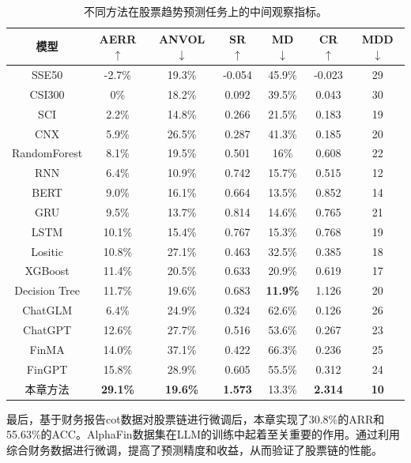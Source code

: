 \begin{table}
	\caption{\label{obv_indice_table}不同方法在股票趋势预测任务上的中间观察指标。}
	\centering{}%
	\small 
	\begin{tabular}{ccccccc}
		\toprule[2pt]
		模型 & AERR $\uparrow$ & ANVOL $\downarrow$ & SR $\uparrow$ & MD $\downarrow$ & CR $\uparrow$ & MDD $\downarrow$ \\
		\hline
		SSE50 & -2.7\% & 19.3\% & -0.054 & 45.9\% & -0.023 & 29 \\
		CSI300 & 0\% & 18.2\% & 0.092 & 39.5\% & 0.043 & 30 \\
		SCI & 2.2\% & 14.8\% & 0.266 & 21.5\% & 0.183 & 19 \\
		CNX & 5.9\% & 26.5\% & 0.287 & 41.3\% & 0.185 & 20 \\
		\hline
		RandomForest & 8.1\% & 19.5\% & 0.501 & 16\% & 0.608 & 22 \\
		RNN & 6.4\% & 10.9\% & 0.742 & 15.7\% & 0.515 & 12 \\
		BERT & 9.0\% & 16.1\% & 0.664 & 13.5\% & 0.852 & 14 \\
		GRU & 9.5\% & 13.7\% & 0.814 & 14.6\% & 0.765 & 21 \\
		LSTM & 10.1\% & 15.4\% & 0.767 & 15.3\% & 0.768 & 19 \\
		Lositic & 10.8\% & 27.1\% & 0.463 & 32.5\% & 0.385 & 18 \\
		XGBoost & 11.4\% & 20.5\% & 0.633 & 20.9\% & 0.619 & 17 \\
		Decision Tree & 11.7\% & 19.6\% & 0.683 & \textbf{11.9\%} & 1.126 & 20 \\
		\hline
		ChatGLM & 6.4\% & 24.9\% & 0.324 & 62.6\% & 0.126 & 26 \\
		ChatGPT & 12.6\% & 27.7\% & 0.516 & 53.6\% & 0.267 & 23 \\
		FinMA & 14.0\% & 37.1\% & 0.422 & 66.3\% & 0.236 & 25 \\
		FinGPT & 15.8\% & 28.9\% & 0.605 & 55.5\% & 0.312 & 24 \\
		\hline
		本章方法 & \textbf{29.1\%} & \textbf{19.6\%} & \textbf{1.573} & 13.3\% & \textbf{2.314} & \textbf{10} \\
		\bottomrule[2pt]
	\end{tabular}
\end{table}

最后，基于财务报告cot数据对股票链进行微调后，本章实现了30.8\%的ARR和55.63\%的ACC。AlphaFin数据集在LLM的训练中起着至关重要的作用。通过利用综合财务数据进行微调，提高了预测精度和收益，从而验证了股票链的性能。

